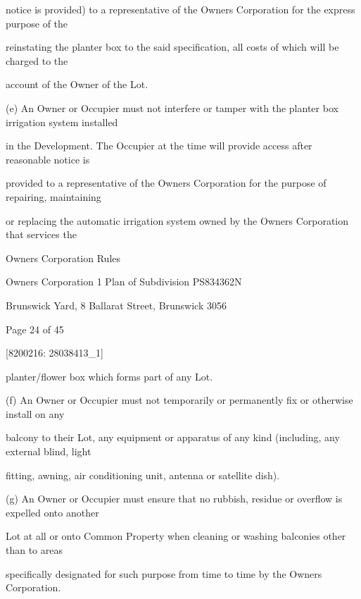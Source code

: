 \documentclass{article}
\begin{document}
{\fontsize{10.02}{1}notice is provided) to a representative of the Owners Corporation for the express purpose of the }

{\fontsize{10.02}{1}reinstating the planter box to the said specification, all costs of which will be charged to the }

{\fontsize{10.02}{1}account of the Owner of the Lot. }

{\fontsize{9.962}{1}(e) An Owner or Occupier must not interfere or tamper with the planter box irrigation system installed }

{\fontsize{10.02}{1}in the Development. The Occupier at the time will provide access after reasonable notice is }

{\fontsize{10.02}{1}provided to a representative of the Owners Corporation for the purpose of repairing, maintaining }

{\fontsize{10.02}{1}or replacing the automatic irrigation system owned by the Owners Corporation that services the }

\newpage





{\fontsize{9}{1}Owners Corporation Rules }

{\fontsize{9}{1}Owners Corporation 1 Plan of Subdivision PS834362N }

{\fontsize{9}{1}Brunswick Yard, 8 Ballarat Street, Brunswick 3056 }


{\fontsize{9}{1}Page 24  of 45 }



{\fontsize{7.02}{1}[8200216: 28038413\_1] }

{\fontsize{10.02}{1}planter/flower box which forms part of any Lot. }

{\fontsize{9.962}{1}(f) An Owner or Occupier must not temporarily or permanently fix or otherwise install on any }

{\fontsize{10.02}{1}balcony to their Lot, any equipment or apparatus of any kind (including, any external blind, light }

{\fontsize{10.02}{1}fitting, awning, air conditioning unit, antenna or satellite dish). }

{\fontsize{9.962}{1}(g) An Owner or Occupier must ensure that no rubbish, residue or overflow is expelled onto another }

{\fontsize{10.02}{1}Lot at all or onto Common Property when cleaning or washing balconies other than to areas }

{\fontsize{10.02}{1}specifically designated for such purpose from time to time by the Owners Corporation. }
\end{document}
